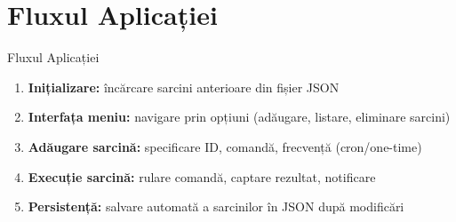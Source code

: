 \documentclass[aspectratio=169]{beamer}
\begin{document}
\section{Fluxul Aplicației}
\begin{frame}{Fluxul Aplicației}
  \begin{enumerate}
    \item \textbf{Inițializare:} încărcare sarcini anterioare din fișier JSON
    \item \textbf{Interfața meniu:} navigare prin opțiuni (adăugare, listare, eliminare sarcini)
    \item \textbf{Adăugare sarcină:} specificare ID, comandă, frecvență (cron/one-time)
    \item \textbf{Execuție sarcină:} rulare comandă, captare rezultat, notificare
    \item \textbf{Persistență:} salvare automată a sarcinilor în JSON după modificări
  \end{enumerate}
  
  \begin{center}
  \end{center}
\end{frame}
\end{document}
